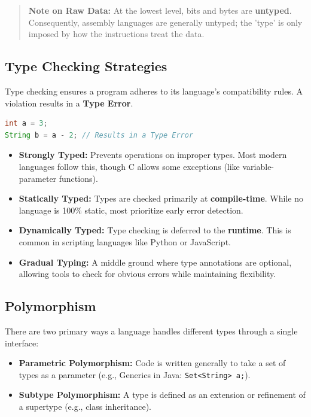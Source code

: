 \documentclass{article}
\begin{document}
\begin{quote}
    \textbf{Note on Raw Data:} At the lowest level, bits and bytes are \textbf{untyped}. Consequently, assembly languages are generally untyped; the 'type' is only imposed by how the instructions treat the data.
\end{quote}

\subsection{Type Checking Strategies}
Type checking ensures a program adheres to its language's compatibility rules. A violation results in a \textbf{Type Error}.

\begin{lstlisting}[language=Java]
int a = 3;
String b = a - 2; // Results in a Type Error
\end{lstlisting}

\begin{itemize}
    \item \textbf{Strongly Typed:} Prevents operations on improper types. Most modern languages follow this, though C allows some exceptions (like variable-parameter functions).
    \item \textbf{Statically Typed:} Types are checked primarily at \textbf{compile-time}. While no language is 100\% static, most prioritize early error detection.
    \item \textbf{Dynamically Typed:} Type checking is deferred to the \textbf{runtime}. This is common in scripting languages like Python or JavaScript.
    \item \textbf{Gradual Typing:} A middle ground where type annotations are optional, allowing tools to check for obvious errors while maintaining flexibility.
\end{itemize}

\subsection{Polymorphism}
There are two primary ways a language handles different types through a single interface:
\begin{itemize}
    \item \textbf{Parametric Polymorphism:} Code is written generally to take a set of types as a parameter (e.g., Generics in Java: \texttt{Set<String> a;}).
    \item \textbf{Subtype Polymorphism:} A type is defined as an extension or refinement of a supertype (e.g., class inheritance).
\end{itemize}
\end{document}
